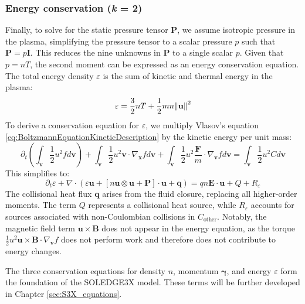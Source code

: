 \subsubsection{Energy conservation (\textit{k} = 2)}
\label{ssec:desc_energyBalance}
Finally, to solve for the static pressure tensor $\boldsymbol{P}$, we assume isotropic pressure in the plasma, simplifying the pressure tensor to a scalar pressure $p$ such that $\boldsymbol{P} = p \boldsymbol{I}$. This reduces the nine unknowns in $\boldsymbol{P}$ to a single scalar $p$. Given that $p = nT$, the second moment can be expressed as an energy conservation equation. The total energy density $\varepsilon$ is the sum of kinetic and thermal energy in the plasma:
\begin{equation}
	\varepsilon = \frac{3}{2} nT + \frac{1}{2} mn \norm{\mathbf{u}}^2
\end{equation}
To derive a conservation equation for $\varepsilon$, we multiply Vlasov's equation \ref{eq:BoltzmannEquationKineticDescription} by the kinetic energy per unit mass:
\begin{equation}
	\partial_t \left( \int_\mathbf{v} \frac{1}{2} u^2 f d\mathbf{v} \right) + \int_\mathbf{v} \frac{1}{2} u^2 \mathbf{v} \cdot \nabla_{\mathbf{x}} f d\mathbf{v} + \int_\mathbf{v} \frac{1}{2} u^2 \frac{\mathbf{F}}{m} \cdot \nabla_{\mathbf{v}} f d\mathbf{v} = \int_\mathbf{v} \frac{1}{2} u^2 C d\mathbf{v}
\end{equation}
This simplifies to:
\begin{equation}
	\label{eq:SecondMomentTransportEquation}
	\partial_t \varepsilon + \nabla \cdot \left( \varepsilon \mathbf{u} + \left[ n \mathbf{u} \otimes \mathbf{u} + \boldsymbol{P} \right] \cdot \mathbf{u} + \mathbf{q} \right) = qn \mathbf{E} \cdot \mathbf{u} + Q + R_\varepsilon
\end{equation}
The collisional heat flux $\mathbf{q}$ arises from the fluid closure, replacing all higher-order moments. The term $Q$ represents a collisional heat source, while $R_\varepsilon$ accounts for sources associated with non-Coulombian collisions in $C_{\text{other}}$. Notably, the magnetic field term $\mathbf{u} \times \mathbf{B}$ does not appear in the energy equation, as the torque $\frac{1}{2} u^2 \mathbf{u} \times \mathbf{B} \cdot \nabla_{\mathbf{v}} f$ does not perform work and therefore does not contribute to energy changes. \newline

The three conservation equations for density $n$, momentum $\boldsymbol{\gamma}$, and energy $\varepsilon$ form the foundation of the SOLEDGE3X model. These terms will be further developed in Chapter \ref{sec:S3X_equations}.



